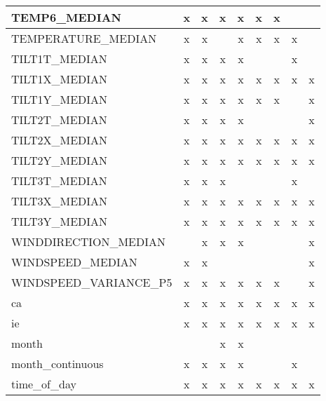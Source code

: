 \begin{longtable}{|lcccccccc|}
    TEMP6\_MEDIAN &      x &      x &      x &      x &      x &      x &        &        \\ \hline
    TEMPERATURE\_MEDIAN &      x &      x &        &      x &      x &      x &      x &        \\ \hline
    TILT1T\_MEDIAN &      x &      x &      x &      x &        &        &      x &        \\ \hline
    TILT1X\_MEDIAN &      x &      x &      x &      x &      x &      x &      x &      x \\ \hline
    TILT1Y\_MEDIAN &      x &      x &      x &      x &      x &      x &        &      x \\ \hline
    TILT2T\_MEDIAN &      x &      x &      x &      x &        &        &        &      x \\ \hline
    TILT2X\_MEDIAN &      x &      x &      x &      x &      x &      x &      x &      x \\ \hline
    TILT2Y\_MEDIAN &      x &      x &      x &      x &      x &      x &      x &      x \\ \hline
    TILT3T\_MEDIAN &      x &      x &      x &        &        &        &      x &        \\ \hline
    TILT3X\_MEDIAN &      x &      x &      x &      x &      x &      x &      x &      x \\ \hline
    TILT3Y\_MEDIAN &      x &      x &      x &      x &      x &      x &      x &      x \\ \hline
    WINDDIRECTION\_MEDIAN &        &      x &      x &      x &        &        &        &      x \\ \hline
    WINDSPEED\_MEDIAN &      x &      x &        &        &        &        &        &      x \\ \hline
    WINDSPEED\_VARIANCE\_P5 &      x &      x &      x &      x &      x &      x &        &      x \\ \hline
    ca &      x &      x &      x &      x &      x &      x &      x &      x \\ \hline
    ie &      x &      x &      x &      x &      x &      x &      x &      x \\ \hline
    month &        &        &      x &      x &        &        &        &        \\ \hline
    month\_continuous &      x &      x &      x &      x &        &        &      x &        \\ \hline
    time\_of\_day &      x &      x &      x &      x &      x &      x &      x &      x \\ \hline
\end{longtable}        


